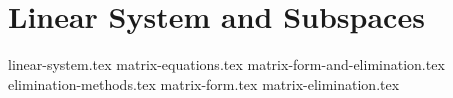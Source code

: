 \chapter{Linear System and Subspaces}
{linear-system.tex}
{matrix-equations.tex}
{matrix-form-and-elimination.tex}
{elimination-methods.tex}
{matrix-form.tex}
{matrix-elimination.tex}